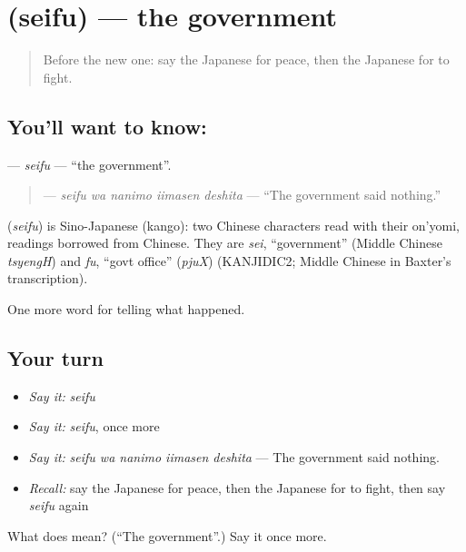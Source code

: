\section[\texorpdfstring{\ja{せいふ} (seifu)}{せいふ (seifu)}]{ (seifu) — the government}

\label{lesson:JA-C282-seifu}



\begin{quote}
Before the new one: say the Japanese for peace, then the Japanese for to fight.
\end{quote}

\subsection*{You'll want to know: }
\textbf{} — \emph{seifu} — \textquotedblleft{}the government\textquotedblright{}.

\begin{quote}
\textbf{  } — \emph{seifu wa nanimo iimasen deshita} — \textquotedblleft{}The government said nothing.\textquotedblright{}
\end{quote}

\begin{cousinweb}
\textbf{} (\emph{seifu}) is Sino-Japanese (kango): two Chinese characters read with their on'yomi, readings borrowed from Chinese. They are \emph{sei}, \textquotedblleft{}government\textquotedblright{} (Middle Chinese \emph{tsyengH}) and \emph{fu}, \textquotedblleft{}govt office\textquotedblright{} (\emph{pjuX}) (KANJIDIC2; Middle Chinese in Baxter's transcription).
\end{cousinweb}

\begin{grammarlens}[title={What you've built}]
One more word for telling what happened.
\end{grammarlens}

\subsection*{Your turn}
\begin{itemize}
\raggedright
  \item \emph{Say it:} \emph{seifu}
  \item \emph{Say it:} \emph{seifu}, once more
  \item \emph{Say it:} \emph{seifu wa nanimo iimasen deshita} — The government said nothing.
  \item \emph{Recall:} say the Japanese for peace, then the Japanese for to fight, then say \emph{seifu} again
\end{itemize}

\begin{tcolorbox}[breakable,colback=teal!4,colframe=teal!35!black,title={Before you move on}]
What does  mean? (\textquotedblleft{}The government\textquotedblright{}.) Say it once more.
\end{tcolorbox}
